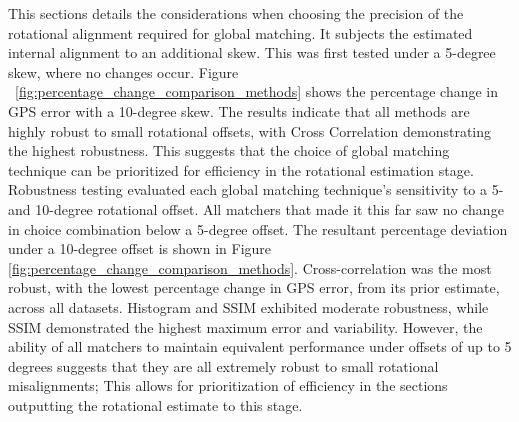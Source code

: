This sections details the considerations when choosing the precision of the rotational alignment required for global matching. It subjects the estimated internal alignment to an additional skew. This was first tested under a 5-degree skew, where no changes occur. Figure ~\ref{fig:percentage_change_comparison_methods} shows the percentage change in GPS error with a 10-degree skew. The results indicate that all methods are highly robust to small rotational offsets, with Cross Correlation demonstrating the highest robustness. This suggests that the choice of global matching technique can be prioritized for efficiency in the rotational estimation stage.
Robustness testing evaluated each global matching technique's sensitivity to a 5- and 10-degree rotational offset. All matchers that made it this far saw no change in choice combination below a 5-degree offset. The resultant percentage deviation under a 10-degree offset is shown in Figure \ref{fig:percentage_change_comparison_methods}. 
Cross-correlation was the most robust, with the lowest percentage change in GPS error, from its prior estimate, across all datasets. Histogram and SSIM exhibited moderate robustness, while SSIM demonstrated the highest maximum error and variability. However, the ability of all matchers to maintain equivalent performance under offsets of up to 5 degrees suggests that they are all extremely robust to small rotational misalignments; This allows for prioritization of efficiency in the sections outputting the rotational estimate to this stage.

